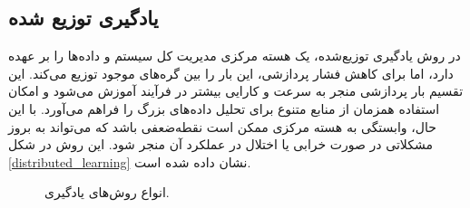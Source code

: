 \subsection{
	یادگیری توزیع شده%
}
در روش یادگیری توزیع‌شده، یک هسته مرکزی مدیریت کل سیستم و داده‌ها را بر عهده دارد، اما برای کاهش فشار پردازشی، این بار را بین گره‌های موجود توزیع می‌کند. این تقسیم بار پردازشی منجر به سرعت و کارایی بیشتر در فرآیند آموزش می‌شود و امکان استفاده همزمان از منابع متنوع برای تحلیل داده‌های بزرگ را فراهم می‌آورد. با این حال، وابستگی به هسته مرکزی ممکن است نقطه‌ضعفی باشد که می‌تواند به بروز مشکلاتی در صورت خرابی یا اختلال در عملکرد آن منجر شود.
این روش در شکل
\ref{distributed_learning}
نشان داده شده است.


\begin{figure}[t!]
	\centering
	\hspace{0.5mm}
	\hspace{0.5mm}
	\caption{انواع روش‌های یادگیری.}
	\label{learning_methods}
\end{figure}



